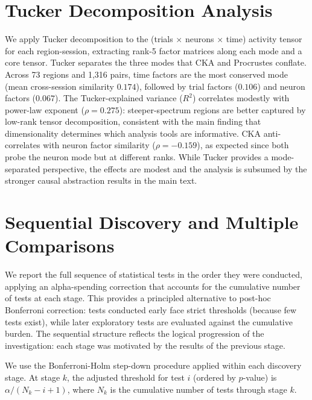 \documentclass{article}
\begin{document}
\appendix
\section{Tucker Decomposition Analysis}
\label{app:tucker}

We apply Tucker decomposition \citep{tucker1966some} to the (trials $\times$ neurons $\times$ time) activity tensor for each region-session, extracting rank-5 factor matrices along each mode and a core tensor. Tucker separates the three modes that CKA and Procrustes conflate. Across 73 regions and 1,316 pairs, time factors are the most conserved mode (mean cross-session similarity $0.174$), followed by trial factors ($0.106$) and neuron factors ($0.067$). The Tucker-explained variance ($R^2$) correlates modestly with power-law exponent ($\rho = 0.275$): steeper-spectrum regions are better captured by low-rank tensor decomposition, consistent with the main finding that dimensionality determines which analysis tools are informative. CKA anti-correlates with neuron factor similarity ($\rho = -0.159$), as expected since both probe the neuron mode but at different ranks. While Tucker provides a mode-separated perspective, the effects are modest and the analysis is subsumed by the stronger causal abstraction results in the main text.

\section{Sequential Discovery and Multiple Comparisons}
\label{app:sequential}

We report the full sequence of statistical tests in the order they were conducted, applying an alpha-spending correction that accounts for the cumulative number of tests at each stage. This provides a principled alternative to post-hoc Bonferroni correction: tests conducted early face strict thresholds (because few tests exist), while later exploratory tests are evaluated against the cumulative burden. The sequential structure reflects the logical progression of the investigation: each stage was motivated by the results of the previous stage.

We use the Bonferroni-Holm step-down procedure applied within each discovery stage. At stage $k$, the adjusted threshold for test $i$ (ordered by $p$-value) is $\alpha / (N_k - i + 1)$, where $N_k$ is the cumulative number of tests through stage $k$.
\end{document}
